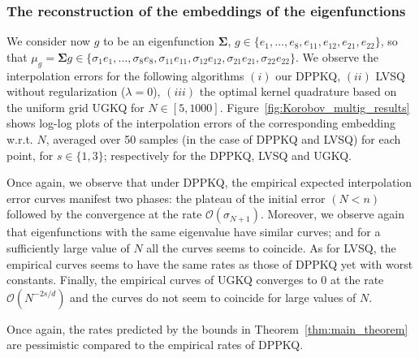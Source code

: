 \documentclass[twoside,11pt]{book}
\numberwithin{theorem}{chapter}
\numberwithin{definition}{chapter}
\numberwithin{proposition}{chapter}
\numberwithin{corollary}{chapter}
\numberwithin{example}{chapter}
\numberwithin{lemma}{chapter}
\numberwithin{assumption}{chapter}
\begin{document}
\subsubsection{The reconstruction of the embeddings of the eigenfunctions}

We consider now $g$ to be an eigenfunction $\bm{\Sigma}$, $g \in \{e_{1},\dots,e_{8},e_{11},e_{12},e_{21},e_{22}\}$, so that $\mu_{g} = \bm{\Sigma}g \in \{\sigma_{1}e_{1},\dots,\sigma_{8}e_{8},\sigma_{11}e_{11},\sigma_{12}e_{12},\sigma_{21}e_{21},\sigma_{22}e_{22}\}$. We observe the interpolation errors for the following algorithms $(i)$ our DPPKQ, $(ii)$ LVSQ without regularization ($\lambda =0$), $(iii)$ the optimal kernel quadrature based on the uniform grid UGKQ for $N \in [5,1000]$. Figure~\ref{fig:Korobov_multig_results} shows log-log plots of the interpolation errors of the corresponding embedding  w.r.t. $N$, averaged over 50 samples (in the case of DPPKQ and LVSQ) for each point, for $s \in \{1,3\}$; respectively for the DPPKQ, LVSQ and UGKQ.

Once again, we observe that under DPPKQ, the empirical expected interpolation error  curves manifest two phases: the plateau of the initial error $(N<n)$ followed by the convergence at the rate $\mathcal{O}(\sigma_{N+1})$. Moreover, we observe again that eigenfunctions with the same eigenvalue have similar curves; and for a sufficiently large value of $N$ all the curves seems to coincide. As for LVSQ, the empirical curves seems to have the same rates as those of DPPKQ yet with worst constants. Finally, the empirical curves of UGKQ converges to $0$ at the rate $\mathcal{O}(N^{-2s/d})$ and the curves do not seem to coincide for large values of $N$.

Once again, the rates predicted by the bounds in Theorem~\ref{thm:main_theorem} are pessimistic compared to the empirical rates of DPPKQ. 
\end{document}
